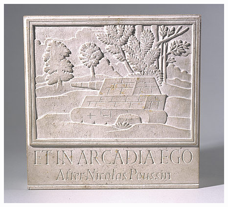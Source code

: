 \documentclass[11pt,compress,professionalfonts]{beamer}
\begin{document}
\begin{frame}[plain]
\centerline{\includegraphics[scale=2.5]{pictures/etinarcadiaego}}
\end{frame}
\end{document}
